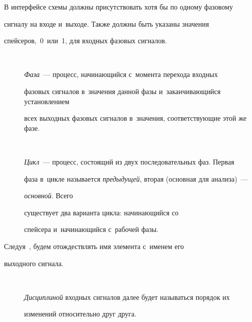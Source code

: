    В интерфейсе схемы должны присутствовать хотя бы по одному фазовому 


сигналу на входе и~выходе. Также должны быть указаны значения 


спейсеров,~0~или~1, для входных фазовых сигналов.


\begin{description}   


\item[\,]     \textit{Фаза}~--- процесс, начинающийся с~момента перехода входных 


фазовых сигналов в~значения данной фазы и~заканчивающийся установлением 


всех выходных фазовых сигналов в~значения, соответствующие этой же фазе.\\[-13pt]


   


\item[\,]     \textit{Цикл}~--- процесс, состоящий из двух последовательных фаз. Первая 


фаза в~цик\-ле называется \textit{предыдущей}, вторая (основная для анализа)~--- 


\textit{основной}. Всего\linebreak\vspace*{-12pt}





\pagebreak





\noindent


 существует два варианта цикла: начинающийся со 


спейсера и~начинающийся с~рабочей фазы.


   \end{description}


   


   Следуя~\cite{1-pl}, будем отождествлять имя элемента с~именем его 


выходного сигнала.


   \begin{description}


\item[\,] \textit{Дисциплиной} входных сигналов далее будет называться порядок их 


изменений относительно друг друга.


\end{description}


